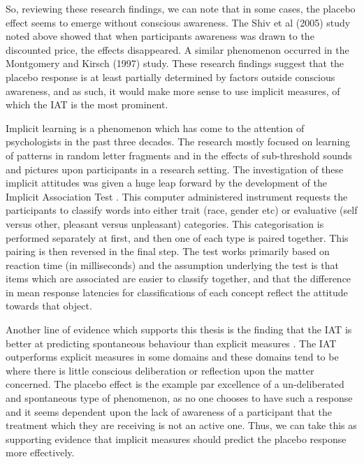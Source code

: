 So, reviewing these research findings, we can note that in some cases, the placebo effect seems to emerge without conscious awareness. The Shiv et al (2005) study noted above showed that when participants awareness was drawn to the discounted price, the effects disappeared. A similar phenomenon occurred in the Montgomery and Kirsch (1997) study. These research findings suggest that the placebo response is at least partially determined by factors outside conscious awareness, and as such, it would make more sense to use implicit measures, of which the IAT is the most prominent. 

Implicit learning is a phenomenon which has come to the attention of psychologists in the past three decades. The research mostly focused on learning of patterns in random letter fragments and in the effects of sub-threshold sounds and pictures upon participants in a research setting. The investigation of these implicit attitudes was given a huge leap forward by the development of the Implicit Association Test \cite{Greenwald1998}. This computer administered instrument requests the participants to classify words into either trait (race, gender etc) or evaluative (self versus other, pleasant versus unpleasant) categories. This categorisation is performed separately at first, and then one of each type is paired together. This pairing is then reversed in the final step. The test works primarily based on reaction time (in milliseconds) and the assumption underlying the test is that items which are associated are easier to classify together, and that the difference in mean response latencies for classifications of each concept reflect the attitude towards that object. 


Another line of evidence which supports this thesis is the finding that the IAT is better at predicting spontaneous behaviour than explicit measures \cite{Conner2005,Hofmann2005}. The IAT outperforms explicit measures in some domains \cite{Greenwald2009} and these domains tend to be where there is little conscious deliberation or reflection upon the matter concerned. The placebo effect is the example par excellence of a un-deliberated and spontaneous  type of phenomenon, as no one chooses to have such a response and it seems dependent upon the lack of awareness of a participant that the treatment which they are receiving is not an active one. Thus, we can take this as supporting evidence that implicit measures should predict the placebo response more effectively. 

